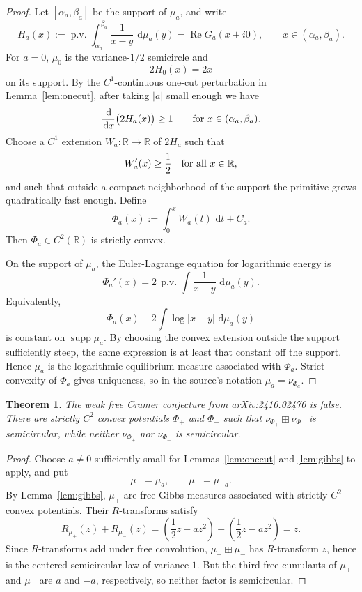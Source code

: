 \documentclass[11pt]{article}
\newtheorem{theorem}{Theorem}
\newcommand{\R}{\mathbb R}
\newcommand{\boxplusfree}{\boxplus}
\newcommand{\dd}{\,\mathrm d}
\newcommand{\supp}{\operatorname{supp}}
\newcommand{\PV}{\operatorname{p.v.}}
\begin{document}
\begin{proof}
Let \([\alpha_a,\beta_a]\) be the support of \(\mu_a\), and write
\[
  H_a(x):=\PV\int_{\alpha_a}^{\beta_a}\frac{1}{x-y}\,\dd\mu_a(y)
       =\operatorname{Re}G_a(x+i0),
  \qquad x\in(\alpha_a,\beta_a).
\]
For \(a=0\), \(\mu_0\) is the variance-\(1/2\) semicircle and
\[
  2H_0(x)=2x
\]
on its support. By the \(C^1\)-continuous one-cut perturbation in
Lemma~\ref{lem:onecut}, after taking \(|a|\) small enough we have
\[
  \frac{\dd}{\dd x}\bigl(2H_a(x)\bigr)\ge 1
  \qquad\hbox{for }x\in(\alpha_a,\beta_a).
\]
Choose a \(C^1\) extension \(W_a:\R\to\R\) of \(2H_a\) such that
\[
  W_a'(x)\ge \frac12\quad\hbox{for all }x\in\R,
\]
and such that outside a compact neighborhood of the support the primitive grows
quadratically fast enough. Define
\[
  \Phi_a(x):=\int_0^x W_a(t)\,\dd t + C_a.
\]
Then \(\Phi_a\in C^2(\R)\) is strictly convex.

On the support of \(\mu_a\), the Euler-Lagrange equation for logarithmic
energy is
\[
  \Phi_a'(x)=2\,\PV\int\frac{1}{x-y}\,\dd\mu_a(y).
\]
Equivalently,
\[
  \Phi_a(x)-2\int\log|x-y|\,\dd\mu_a(y)
\]
is constant on \(\supp\mu_a\). By choosing the convex extension outside the
support sufficiently steep, the same expression is at least that constant off
the support. Hence \(\mu_a\) is the logarithmic equilibrium measure associated
with \(\Phi_a\). Strict convexity of \(\Phi_a\) gives uniqueness, so in the
source's notation \(\mu_a=\nu_{\Phi_a}\).
\end{proof}

\begin{theorem}
The weak free Cramer conjecture from arXiv:2410.02470 is false. There are
strictly \(C^2\) convex potentials \(\Phi_+\) and \(\Phi_-\) such that
\(\nu_{\Phi_+}\boxplusfree\nu_{\Phi_-}\) is semicircular, while neither
\(\nu_{\Phi_+}\) nor \(\nu_{\Phi_-}\) is semicircular.
\end{theorem}

\begin{proof}
Choose \(a\ne0\) sufficiently small for Lemmas~\ref{lem:onecut} and
\ref{lem:gibbs} to apply, and put
\[
  \mu_+=\mu_a,\qquad \mu_-=\mu_{-a}.
\]
By Lemma~\ref{lem:gibbs}, \(\mu_\pm\) are free Gibbs measures associated with
strictly \(C^2\) convex potentials. Their \(R\)-transforms satisfy
\[
  R_{\mu_+}(z)+R_{\mu_-}(z)
  =
  \left(\frac12z+a z^2\right)
  +
  \left(\frac12z-a z^2\right)
  =
  z.
\]
Since \(R\)-transforms add under free convolution, \(\mu_+\boxplusfree\mu_-\)
has \(R\)-transform \(z\), hence is the centered semicircular law of variance
\(1\). But the third free cumulants of \(\mu_+\) and \(\mu_-\) are \(a\) and
\(-a\), respectively, so neither factor is semicircular.
\end{proof}
\end{document}
